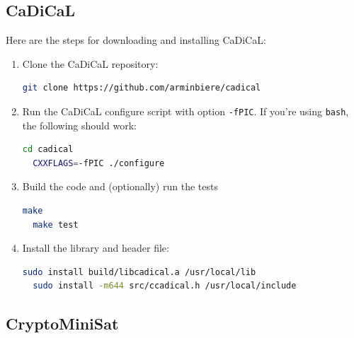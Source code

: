 \documentclass[11pt,twoside,fleqn,openright,titlepage]{cslreport}
\begin{document}
\subsection*{CaDiCaL}

Here are the steps for downloading and installing CaDiCaL:
\begin{enumerate}
\item Clone the CaDiCaL repository:
\begin{small}
\begin{lstlisting}[language=sh]
  git clone https://github.com/arminbiere/cadical
\end{lstlisting}
\end{small}
\item Run the CaDiCaL configure script with option \texttt{-fPIC}. If
  you're using \texttt{bash}, the following should work:
\begin{small}
\begin{lstlisting}[language=sh,deletekeywords={cd}]
  cd cadical
  CXXFLAGS=-fPIC ./configure
\end{lstlisting}
\end{small}
\item Build the code and (optionally) run the tests
\begin{small}
\begin{lstlisting}[language=sh,deletekeywords={test}]
  make
  make test
\end{lstlisting}
\end{small}
\item Install the library and header file:
\begin{small}
\begin{lstlisting}[language=sh]
  sudo install build/libcadical.a /usr/local/lib
  sudo install -m644 src/ccadical.h /usr/local/include
\end{lstlisting}
\end{small}
\end{enumerate}

\subsection*{CryptoMiniSat}
\end{document}
